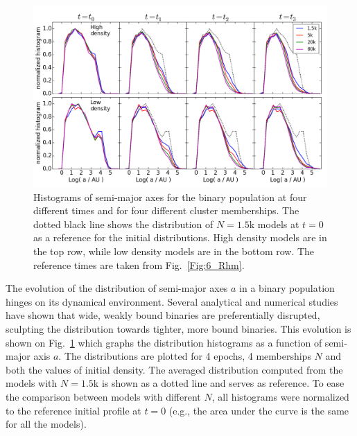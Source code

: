 \begin{figure}
\begin{center}
\includegraphics[width=\textwidth]{Figures/6_SMAxis_histogram}
\caption[Semi-major axis distribution for all models and 4 epochs]{Histograms of semi-major axes for the binary population at four different times and for four different cluster memberships. The dotted black line shows the distribution of $N = 1.5$k models at $t=0$ as a reference for the initial distributions. High density models are in the top row, while low density models are in the bottom row. The reference times are taken from Fig.~\ref{Fig:6_Rhm}.}
\label{Fig:6_SMAxis_histogram}
\end{center}
\end{figure}

The evolution of the distribution of semi-major axes $a $ %
in a binary population hinges on its dynamical environment. Several analytical and numerical studies
\citep{Heggie1975,Kroupa1995,Kroupa1995a,Vesperini1996,Heggie2006,Parker2009,Parker2011} have shown that wide, weakly bound binaries are preferentially disrupted, sculpting the distribution towards tighter, more bound binaries. 
This evolution is shown on Fig.~\ref{Fig:6_SMAxis_histogram} which graphs the distribution histograms as a function of semi-major axis $a$. The distributions are plotted for 4 epochs, 4 memberships $N$ and both the values of initial density. The averaged distribution computed from the models with $N = 1.5$k is shown as a dotted line and serves as reference. To ease the comparison between models with different $N$, all histograms were normalized to the reference initial profile at $t=0$ (e.g., the area under the curve is the same for all the models).


